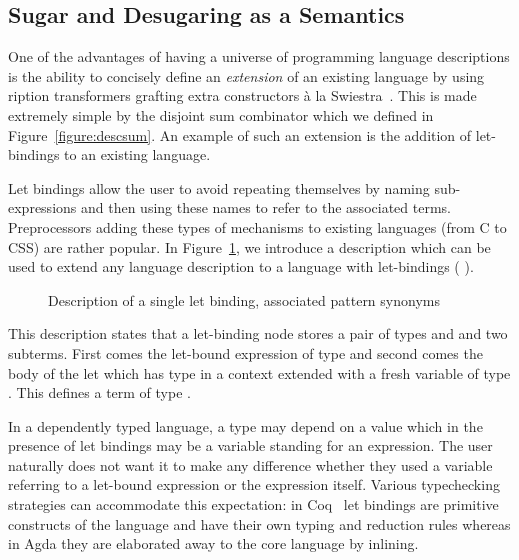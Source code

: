 \subsection{Sugar and Desugaring as a Semantics}\label{section:letbinding}

One of the advantages of having a universe of programming language
descriptions is the ability to concisely define an \emph{extension}
of an existing language by using ription transformers
grafting extra constructors à la Swiestra~\citeyear{swierstra_2008}.
This is made extremely simple by the disjoint sum combinator
 which we defined in Figure~\ref{figure:descsum}.
An example of such an extension is the addition of let-bindings to
an existing language.

Let bindings allow the user to avoid repeating themselves by naming
sub-expressions and then using these names to refer to the associated
terms. Preprocessors adding these types of mechanisms to existing
languages (from C to CSS) are rather popular. In Figure~\ref{defn:letD},
we introduce a description  which can be used to extend any
language description  to a language with let-bindings
(  ).

\begin{figure}[h]
\begin{minipage}[t]{0.45\textwidth}
\end{minipage}
\begin{minipage}[t]{0.45\textwidth}
\end{minipage}
\caption{Description of a single let binding, associated pattern synonyms
  \label{defn:letD}}
\end{figure}

This description states that a let-binding node stores a pair of types
 and  and two subterms. First comes the let-bound
expression of type  and second comes the body of the let which
has type  in a context extended with a fresh variable of type
. This defines a term of type .

In a dependently typed language, a type may depend on a value which
in the presence of let bindings may be a variable standing for an
expression. The user naturally does not want it to make any difference
whether they used a variable referring to a let-bound expression or
the expression itself. Various typechecking strategies can accommodate
this expectation: in Coq~\cite{Coq:manual} let bindings are primitive
constructs of the language and have their own typing and reduction
rules whereas in Agda they are elaborated away to the core language
by inlining.

